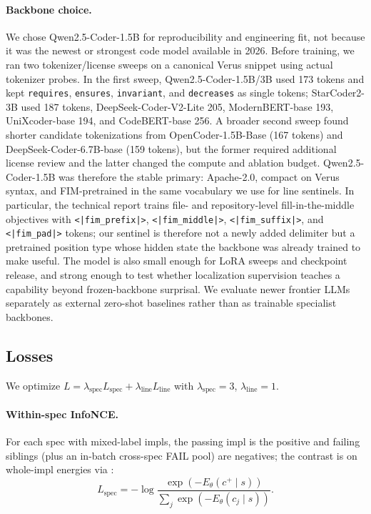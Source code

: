 \documentclass[10pt]{article}
\begin{document}
\paragraph{Backbone choice.}
We chose Qwen2.5-Coder-1.5B for reproducibility and engineering fit,
not because it was the newest or strongest code model available in
2026. Before training, we ran two tokenizer/license sweeps on a
canonical Verus snippet using actual tokenizer probes. In the first
sweep, Qwen2.5-Coder-1.5B/3B used 173 tokens and kept
\texttt{requires}, \texttt{ensures}, \texttt{invariant}, and
\texttt{decreases} as single tokens; StarCoder2-3B used 187 tokens,
DeepSeek-Coder-V2-Lite 205, ModernBERT-base 193, UniXcoder-base 194,
and CodeBERT-base 256. A broader second sweep found shorter
candidate tokenizations from OpenCoder-1.5B-Base (167 tokens) and
DeepSeek-Coder-6.7B-base (159 tokens), but the former required
additional license review and the latter changed the compute and
ablation budget. Qwen2.5-Coder-1.5B was therefore the stable primary:
Apache-2.0, compact on Verus syntax, and FIM-pretrained in the same
vocabulary we use for line sentinels. In particular, the technical
report trains file- and repository-level fill-in-the-middle objectives
with \verb+<|fim_prefix|>+, \verb+<|fim_middle|>+,
\verb+<|fim_suffix|>+, and \verb+<|fim_pad|>+ tokens; our sentinel is
therefore not a newly added delimiter but a pretrained position type
whose hidden state the backbone was already trained to make useful.
The model is also small enough for LoRA sweeps and checkpoint release,
and strong enough to test whether localization supervision teaches a
capability beyond frozen-backbone surprisal. We evaluate newer
frontier LLMs separately as external zero-shot baselines rather than
as trainable specialist backbones.

\subsection{Losses}
\label{sec:methods:losses}
We optimize $L = \lambda_{\text{spec}} L_{\text{spec}} + \lambda_{\text{line}} L_{\text{line}}$ with
$\lambda_{\text{spec}} = 3$, $\lambda_{\text{line}} = 1$.

\paragraph{Within-spec InfoNCE.}
For each spec with mixed-label impls, the passing impl is the positive and
failing siblings (plus an in-batch cross-spec FAIL pool) are negatives;
the contrast is on whole-impl energies via :
\begin{equation}
L_{\text{spec}} = -\log \frac{\exp(-E_\theta(c^+ \mid s))}{\sum_j \exp(-E_\theta(c_j \mid s))}.
\end{equation}
\end{document}
